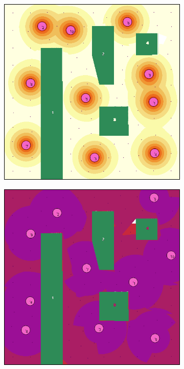\documentclass[letterpaper, 10 pt, conference]{ieeeconf}
\begin{document}
\begin{figure}[!h]
\begin{subfigure}[t]{0.3\columnwidth}
    \caption{}
\end{subfigure}%
\hfill
\begin{subfigure}[t]{0.3\columnwidth}
    \centering
    \includegraphics[width=\columnwidth]{Figures/GeneralDecay025.png}
    \caption{}
\end{subfigure}%
\hfill
\begin{subfigure}[t]{0.3\columnwidth}
    \centering
    \includegraphics[width=\columnwidth]{Figures/GeneralDecay001.png}
    \caption{}
\end{subfigure}%
\caption{}
\label{Fig:GeneralDecay}
\end{figure}
\end{document}
